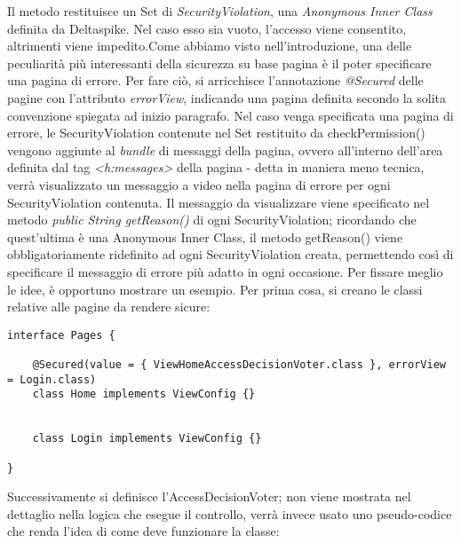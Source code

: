 Il metodo restituisce un Set di \textsl{SecurityViolation}, una \textsl{Anonymous Inner Class} definita da Deltaspike. Nel caso esso sia vuoto, l'accesso viene consentito, altrimenti viene impedito.\newline Come abbiamo visto nell'introduzione, una delle peculiarità più interessanti della sicurezza su base pagina è il poter specificare una pagina di errore. Per fare ciò, si arricchisce l'annotazione \textsl{@Secured} delle pagine con l'attributo \textsl{errorView}, indicando una pagina definita secondo la solita convenzione spiegata ad inizio paragrafo. Nel caso venga specificata una pagina di errore, le SecurityViolation contenute nel Set restituito da checkPermission() vengono aggiunte al \textit{bundle} di messaggi della pagina, ovvero all'interno dell'area definita dal tag \textsl{\textless h:messages\textgreater} della pagina - detta in maniera meno tecnica, verrà visualizzato un messaggio a video nella pagina di errore per ogni SecurityViolation contenuta. \newline Il messaggio da visualizzare viene specificato nel metodo \textsl{public String getReason()} di ogni SecurityViolation; ricordando che quest'ultima è una Anonymous Inner Class, il metodo getReason() viene obbligatoriamente ridefinito ad ogni SecurityViolation creata, permettendo così di specificare il messaggio di errore più adatto in ogni occasione.\newpage
Per fissare meglio le idee, è opportuno mostrare un esempio. Per prima cosa, si creano le classi relative alle pagine da rendere sicure:

\begin{lstlisting}
interface Pages {

	@Secured(value = { ViewHomeAccessDecisionVoter.class }, errorView = Login.class)
	class Home implements ViewConfig {}

	
	class Login implements ViewConfig {}

}
\end{lstlisting}

Successivamente si definisce l'AccessDecisionVoter; non viene mostrata nel dettaglio nella logica che esegue il controllo, verrà invece usato uno pseudo-codice che renda l'idea di come deve funzionare la classe:

